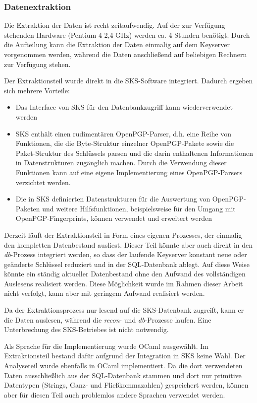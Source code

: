 \subsubsection{Datenextraktion}
\label{sec:datenextraktion}

Die Extraktion der Daten ist recht zeitaufwendig. Auf der zur
Verfügung stehenden Hardware (Pentium 4 2,4 GHz) werden ca. 4 Stunden
benötigt. Durch die Aufteilung kann die Extraktion der Daten einmalig
auf dem Keyserver vorgenommen werden, während die Daten anschließend
auf beliebigen Rechnern zur Verfügung stehen.

Der Extraktionsteil wurde direkt in die SKS-Software
integriert. Dadurch ergeben sich mehrere Vorteile: 

\begin{itemize}
\item Das Interface von SKS für den Datenbankzugriff kann
  wiederverwendet werden
\item SKS enthält einen rudimentären OpenPGP-Parser, d.h. eine Reihe
  von Funktionen, die die Byte-Struktur einzelner OpenPGP-Pakete sowie
  die Paket-Struktur des Schlüssels parsen und die darin enthaltenen
  Informationen in Datenstrukturen zugänglich machen. Durch die
  Verwendung dieser Funktionen kann auf eine eigene Implementierung
  eines OpenPGP-Parsers verzichtet werden.
\item Die in SKS definierten Datenstrukturen für die Auswertung von
  OpenPGP-Paketen und weitere Hilfsfunktionen, beispielsweise für den
  Umgang mit OpenPGP-Fingerprints, können verwendet und erweitert werden
\end{itemize}

Derzeit läuft der Extraktionsteil in Form eines eigenen Prozesses, der
einmalig den kompletten Datenbestand ausliest. Dieser Teil könnte aber
auch direkt in den \emph{db}-Prozess integriert werden, so dass der
laufende Keyserver konstant neue oder geänderte Schlüssel reduziert
und in der SQL-Datenbank ablegt. Auf diese Weise könnte ein ständig
aktueller Datenbestand ohne den Aufwand des vollständigen Auslesens
realisiert werden. Diese Möglichkeit wurde im Rahmen dieser Arbeit
nicht verfolgt, kann aber mit geringem Aufwand realisiert werden.

Da der Extraktionsprozess nur lesend auf die SKS-Datenbank zugreift,
kann er die Daten auslesen, während die \emph{recon}- und
\emph{db}-Prozesse laufen. Eine Unterbrechung des SKS-Betriebes ist
nicht notwendig.

Als Sprache für die Implementierung wurde OCaml ausgewählt. Im
Extraktionsteil bestand dafür aufgrund der Integration in SKS keine
Wahl. Der Analyseteil wurde ebenfalls in OCaml implementiert. Da die
dort verwendeten Daten ausschließlich aus der SQL-Datenbank stammen
und dort nur primitive Datentypen (Strings, Ganz- und
Fließkommazahlen) gespeichert werden, können aber für diesen Teil
auch problemlos andere Sprachen verwendet werden.

